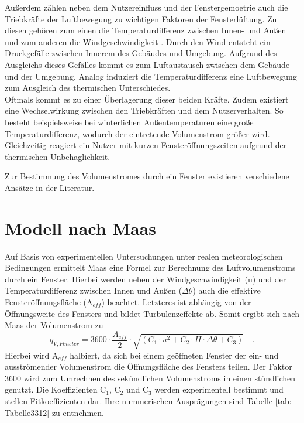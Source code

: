 Außerdem zählen neben dem Nutzereinfluss und der Fenstergemoetrie auch die Triebkräfte der Luftbewegung zu wichtigen Faktoren der Fensterlüftung.
Zu diesen gehören zum einen die Temperaturdifferenz zwischen Innen- und Außen und zum anderen die Windgeschwindigkeit \cite{Schild.2013b}.
Durch den Wind entsteht ein Druckgefälle zwischen Innerem des Gebäudes und Umgebung.
Aufgrund des Ausgleichs dieses Gefälles kommt es zum Luftaustausch zwischen dem Gebäude und der Umgebung.
Analog induziert die Temperaturdifferenz eine Luftbewegung zum Ausgleich des thermischen Unterschiedes. \cite{Maas.2017} \\
Oftmals kommt es zu einer Überlagerung dieser beiden Kräfte.
Zudem existiert eine Wechselwirkung zwischen den Triebkräften und dem Nutzerverhalten.
So besteht beispielsweise bei winterlichen Außentemperaturen eine große Temperaturdifferenz, wodurch der eintretende Volumenstrom größer wird.
Gleichzeitig reagiert ein Nutzer mit kurzen Fensteröffnungszeiten aufgrund der thermischen Unbehaglichkeit. 

Zur Bestimmung des Volumenstromes durch ein Fenster existieren verschiedene Ansätze in der Literatur.

\section*{Modell nach Maas}
Auf Basis von experimentellen Untersuchungen unter realen meteorologischen Bedingungen ermittelt Maas \cite{Maas.1995} eine Formel zur Berechnung des Luftvolumenstroms durch ein Fenster.
Hierbei werden neben der Windgeschwindigkeit (u) und der Temperaturdifferenz zwischen Innen und Außen (\(\Delta \theta\)) auch die effektive Fensteröffnungsfläche (A\(_{eff}\)) beachtet. 
Letzteres ist abhängig von der Öffnungsweite des Fensters und bildet Turbulenzeffekte ab.
Somit ergibt sich nach Maas der Volumenstrom zu
\begin{equation}
\label{eq:Gleichung3311}
q_{V, Fenster} = 3600 \cdot \frac{A_{eff}}{2} \cdot \sqrt{(C_1 \cdot u^2 + C_2 \cdot H \cdot \Delta \theta + C_3)} \quad \text{.}
\end{equation}
Hierbei wird A\(_{eff}\) halbiert, da sich bei einem geöffneten Fenster der ein- und ausströmender Volumenstrom die Öffnungsfläche des Fensters teilen.
Der Faktor 3600 wird zum Umrechnen des sekündlichen Volumenstroms in einen stündlichen genutzt.
Die Koeffizienten C\(_1\), C\(_2\) und C\(_3\) werden experimentell bestimmt und stellen Fitkoeffizienten dar.
Ihre nummerischen Ausprägungen sind Tabelle \ref{tab: Tabelle3312} zu entnehmen.

